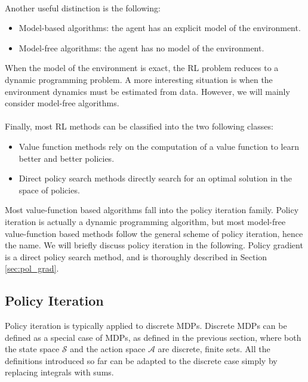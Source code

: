\paragraph{} %
Another useful distinction is the following:
\begin{itemize}
\item Model-based algorithms: the agent has an explicit model of the environment.
\item Model-free algorithms: the agent has no model of the environment.
\end{itemize}
When the model of the environment is exact, the \ac{RL} problem reduces to a dynamic programming problem. A more interesting situation is when the environment dynamics must be estimated from data. However, we will mainly consider model-free algorithms.
\paragraph{} %
Finally, most \ac{RL} methods can be classified into the two following classes:
\begin{itemize}
\item Value function methods rely on the computation of a value function to learn better and better policies.
\item Direct policy search methods directly search for an optimal solution in the space of policies.
\end{itemize}
Most value-function based algorithms fall into the policy iteration family. Policy iteration is actually a dynamic programming algorithm, but most model-free value-function based methods follow the general scheme of policy iteration, hence the name. We will briefly discuss policy iteration in the following.
Policy gradient is a direct policy search method, and is thoroughly described in Section \ref{sec:pol_grad}.

\subsection{Policy Iteration}\label{sec:pol_iter}
Policy iteration is typically applied to discrete \ac{MDP}s. Discrete \ac{MDP}s can be defined as a special case of \ac{MDP}s, as defined in the previous section, where both the state space $\mathcal{S}$ and the action space $\mathcal{A}$ are discrete, finite sets. All the definitions introduced so far can be adapted to the discrete case simply by replacing integrals with sums.
